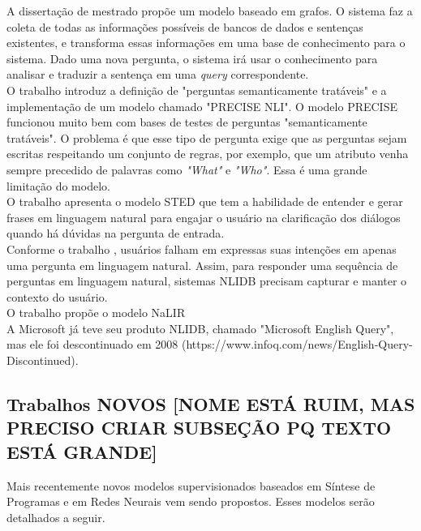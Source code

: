 \documentclass{article}
\begin{document}
A dissertação de mestrado \citep{chandra2006natural} propõe um modelo baseado em grafos. O sistema faz a coleta de todas as informações possíveis de bancos de dados e sentenças existentes, e transforma essas informações em uma base de conhecimento para o sistema. Dado uma nova pergunta, o sistema irá usar o conhecimento para analisar e traduzir a sentença em uma \textit{query} correspondente. \\

O trabalho \cite{popescu2003towards} introduz a definição de "perguntas semanticamente tratáveis" e a implementação de um modelo chamado "PRECISE NLI". O modelo PRECISE funcionou muito bem com bases de testes de perguntas "semanticamente tratáveis". O problema é que esse tipo de pergunta exige que as perguntas sejam escritas respeitando um conjunto de regras, por exemplo, que um atributo venha sempre precedido de palavras como \textit{"What"} e \textit{"Who"}. Essa é uma grande limitação do modelo. \\

O trabalho \citep{minock2005phrasal} apresenta o modelo STED que tem a habilidade de entender e gerar frases em linguagem natural para engajar o usuário na clarificação dos diálogos quando há dúvidas na pergunta de entrada. \\

Conforme o trabalho \citep{akula2013novel}, usuários falham em expressas suas intenções em apenas uma pergunta em linguagem natural. Assim, para responder uma sequência de perguntas em linguagem natural, sistemas NLIDB precisam capturar e manter o contexto do usuário. \\

O trabalho \citep{li2014constructing} propõe o modelo NaLIR \\

A Microsoft já teve seu produto NLIDB, chamado "Microsoft English Query", mas ele foi descontinuado em 2008 (https://www.infoq.com/news/English-Query-Discontinued).\\

\subsection{Trabalhos NOVOS [NOME ESTÁ RUIM, MAS PRECISO CRIAR SUBSEÇÃO PQ TEXTO ESTÁ GRANDE]}

Mais recentemente novos modelos supervisionados baseados em Síntese de Programas e em Redes Neurais vem sendo propostos. Esses modelos serão detalhados a seguir.\\
\end{document}
